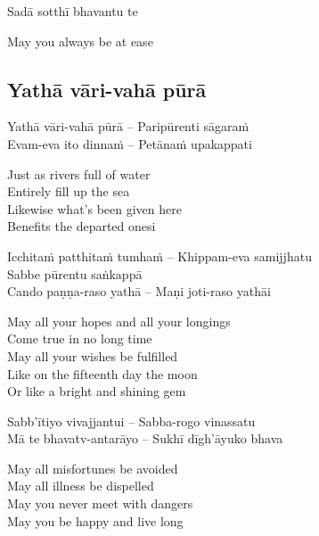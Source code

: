 Sadā sotthī bhavantu te

\begin{english}
  May you always be at ease
\end{english}



\subsection{Yathā vāri-vahā pūrā}
\label{yatha-vari-vaha-pura}

\begin{twochants}
  Yathā vāri-vahā pūrā – Paripūrenti sāgaraṁ\\
  Evam-eva ito dinnaṁ – Petānaṁ upakappati
\end{twochants}

\begin{english-verses}
  Just as rivers full of water\\
  Entirely fill up the sea\\
  Likewise what's been given here\\
  Benefits the departed onesi
\end{english-verses}

\suttaRef{[Khp 1.7]}

\begin{pali-hang}
  Icchitaṁ patthitaṁ tumhaṁ – Khippam-eva samijjhatu\\
  Sabbe pūrentu saṅkappā\\
  Cando paṇṇa-raso yathā – Maṇi joti-raso yathāi
\end{pali-hang}

\begin{english-verses}
  May all your hopes and all your longings\\
  Come true in no long time\\
  May all your wishes be fulfilled\\
  Like on the fifteenth day the moon\\
  Or like a bright and shining gem
\end{english-verses}

\begin{twochants}
  Sabb'ītiyo vivajjantui – Sabba-rogo vinassatu\\
  Mā te bhavatv-antarāyo – Sukhī dīgh'āyuko bhava
\end{twochants}

\begin{english-verses}
  May all misfortunes be avoided\\
  May all illness be dispelled\\
  May you never meet with dangers\\
  May you be happy and live long
\end{english-verses}

